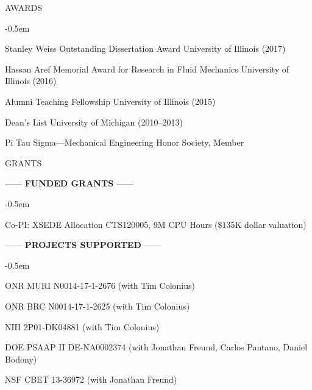 \documentclass{resume} %
\newcommand{\sepss}{-0.5em}
\begin{document}
\begin{rSection}{{\Large A}WARDS}
	\begin{list}{\textbullet}{\leftmargin=2.5em} 	  	
	    \itemsep \sepss
		\item Stanley Weiss Outstanding Dissertation Award 
		    \hfill University of Illinois (2017)
		\item Hassan Aref Memorial Award for Research in Fluid Mechanics 
		    \hfill University of Illinois (2016)
		\item	 Alumni Teaching Fellowship  \hfill University of Illinois (2015)
		\item Dean's List  \hfill University of Michigan  (2010--2013)
		\item Pi Tau Sigma---Mechanical Engineering Honor Society, Member
	\end{list}
\end{rSection}

\begin{rSection}{{\Large G}RANTS}

\smallskip
\begin{center}
    ------ \textbf{FUNDED GRANTS} ------
\end{center}

\begin{list}{\textbullet}{\leftmargin=2.5em} 	  	
    \itemsep \sepss 
    \item Co-PI: XSEDE Allocation CTS120005, 9M CPU Hours ($\$135$K dollar valuation)
\end{list}
\smallskip


\begin{center}
    ------ \textbf{PROJECTS SUPPORTED} ------
\end{center}

\begin{list}{\textbullet}{\leftmargin=2.5em} 	  	
	\itemsep \sepss 
    \item ONR MURI N0014-17-1-2676 (with Tim Colonius) %
    \item ONR BRC N0014-17-1-2625 (with Tim Colonius) %
    \item NIH 2P01-DK04881 (with Tim Colonius)
    \item DOE PSAAP II DE-NA0002374 (with Jonathan Freund, Carlos Pantano,  Daniel Bodony)   
    \item NSF CBET 13-36972 (with Jonathan Freund) %
\end{list}
\end{rSection}
\end{document}
